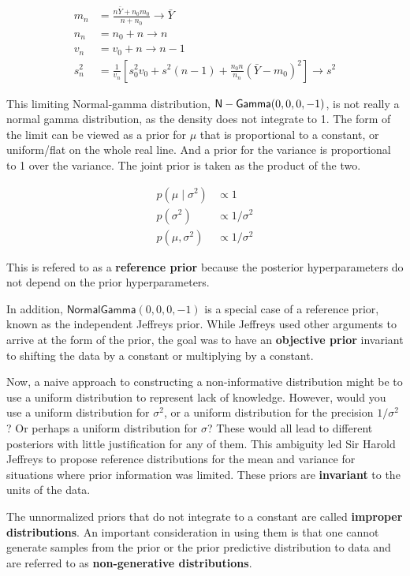 \documentclass[]{book}
\theoremstyle{definition}
\theoremstyle{definition}
\theoremstyle{definition}
\theoremstyle{remark}
\begin{document}
\[\begin{aligned}
m_n &= \frac{n \bar{Y} + n_0 m_0} {n + n_0}  \rightarrow \bar{Y} \\
n_n &= n_0 + n  \rightarrow n \\
v_n &= v_0 + n  \rightarrow n-1 \\
s^2_n &= \frac{1}{v_n}\left[s^2_0 v_0 + s^2 (n-1) + \frac{n_0 n}{n_n} (\bar{Y} - m_0)^2 \right] \rightarrow s^2
\end{aligned}\]

This limiting Normal-gamma distribution, \(\textsf{N}-\textsf{Gamma}(0,0,0,-1)\), is not
really a normal gamma distribution, as the density does not integrate to
1. The form of the limit can be viewed as a prior for \(\mu\) that is
proportional to a constant, or uniform/flat on the whole real line. And
a prior for the variance is proportional to 1 over the variance. The
joint prior is taken as the product of the two.

\[\begin{aligned}
p(\mu \mid \sigma^2) & \propto  1 \\
p(\sigma^2) & \propto  1/\sigma^2 \\
p(\mu, \sigma^2) & \propto  1/\sigma^2
\end{aligned}\]

This is refered to as a \textbf{reference prior} because the posterior
hyperparameters do not depend on the prior hyperparameters.

In addition, \(\textsf{NormalGamma}(0,0,0,-1)\) is a special case of a
reference prior, known as the independent Jeffreys prior. While Jeffreys
used other arguments to arrive at the form of the prior, the goal was to
have an \textbf{objective prior} invariant to shifting the data by a
constant or multiplying by a constant.

Now, a naive approach to constructing a non-informative distribution
might be to use a uniform distribution to represent lack of knowledge.
However, would you use a uniform distribution for \(\sigma^2\), or a
uniform distribution for the precision \(1/\sigma^2\)? Or perhaps a
uniform distribution for \(\sigma\)? These would all lead to different
posteriors with little justification for any of them. This ambiguity led
Sir Harold Jeffreys to propose reference distributions for the mean and
variance for situations where prior information was limited. These
priors are \textbf{invariant} to the units of the data.

The unnormalized priors that do not integrate to a constant are called
\textbf{improper distributions}. An important consideration in using
them is that one cannot generate samples from the prior or the prior
predictive distribution to data and are referred to as
\textbf{non-generative distributions}.
\end{document}
